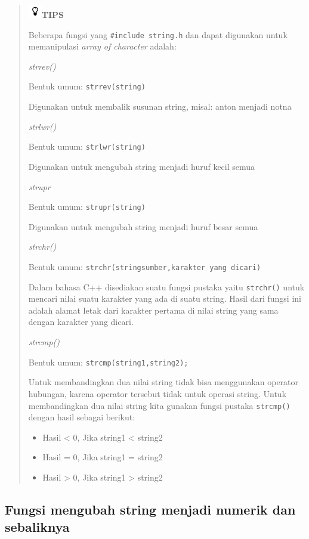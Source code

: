 \begin{quotation}
\includegraphics{../manuscript/images/tips.png}\textbf{TIPS}

Beberapa fungsi yang \texttt{\#include\ string.h} dan dapat digunakan
untuk memanipulasi \emph{array of character} adalah:

\emph{strrev()}

Bentuk umum: \texttt{strrev(string)}

Digunakan untuk membalik susunan string, misal: anton menjadi notna

\emph{strlwr()}

Bentuk umum: \texttt{strlwr(string)}

Digunakan untuk mengubah string menjadi huruf kecil semua

\emph{strupr}

Bentuk umum: \texttt{strupr(string)}

Digunakan untuk mengubah string menjadi huruf besar semua

\emph{strchr()}

Bentuk umum: \texttt{strchr(stringsumber,karakter\ yang\ dicari)}

Dalam bahasa C++ disediakan suatu fungsi pustaka yaitu \texttt{strchr()}
untuk mencari nilai suatu karakter yang ada di suatu string. Hasil dari
fungsi ini adalah alamat letak dari karakter pertama di nilai string
yang sama dengan karakter yang dicari.

\emph{strcmp()}

Bentuk umum: \texttt{strcmp(string1,string2);}

Untuk membandingkan dua nilai string tidak bisa menggunakan operator
hubungan, karena operator tersebut tidak untuk operasi string. Untuk
membandingkan dua nilai string kita gunakan fungsi pustaka
\texttt{strcmp()} dengan hasil sebagai berikut:

\begin{itemize}

\item
Hasil \textless{} 0, Jika string1 \textless{} string2
\item
Hasil = 0, Jika string1 = string2
\item
Hasil \textgreater{} 0, Jika string1 \textgreater{} string2
\end{itemize}
\end{quotation}


\subsection{Fungsi mengubah string menjadi numerik dan sebaliknya}\label{fungsi-mengubah-string-menjadi-numerik-dan-sebaliknya}

